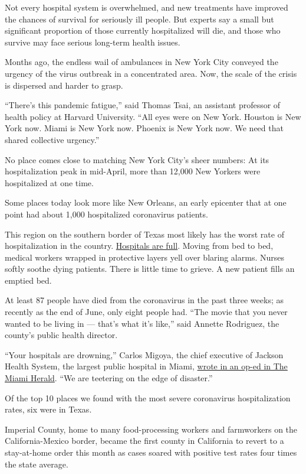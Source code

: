 Not every hospital system is overwhelmed, and new treatments have
improved the chances of survival for seriously ill people. But experts
say a small but significant proportion of those currently hospitalized
will die, and those who survive may face serious long-term health
issues.

Months ago, the endless wail of ambulances in New York City conveyed the
urgency of the virus outbreak in a concentrated area. Now, the scale of
the crisis is dispersed and harder to grasp.

``There's this pandemic fatigue,'' said Thomas Tsai, an assistant
professor of health policy at Harvard University. ``All eyes were on New
York. Houston is New York now. Miami is New York now. Phoenix is New
York now. We need that shared collective urgency.''

No place comes close to matching New York City's sheer numbers: At its
hospitalization peak in mid-April, more than 12,000 New Yorkers were
hospitalized at one time.

Some places today look more like New Orleans, an early epicenter that at
one point had about 1,000 hospitalized coronavirus patients.

This region on the southern border of Texas most likely has the worst
rate of hospitalization in the country.
\href{https://www.nytimes3xbfgragh.onion/2020/07/19/us/coronavirus-texas-rio-grande-valley.html}{Hospitals
are full}. Moving from bed to bed, medical workers wrapped in protective
layers yell over blaring alarms. Nurses softly soothe dying patients.
There is little time to grieve. A new patient fills an emptied bed.

At least 87 people have died from the coronavirus in the past three
weeks; as recently as the end of June, only eight people had. ``The
movie that you never wanted to be living in --- that's what it's like,''
said Annette Rodriguez, the county's public health director.

``Your hospitals are drowning,'' Carlos Migoya, the chief executive of
Jackson Health System, the largest public hospital in Miami,
\href{https://www.miamiherald.com/opinion/op-ed/article244194817.html}{wrote
in an op-ed in The Miami Herald}. ``We are teetering on the edge of
disaster.''

Of the top 10 places we found with the most severe coronavirus
hospitalization rates, six were in Texas.

Imperial County, home to many food-processing workers and farmworkers on
the California-Mexico border, became the first county in California to
revert to a stay-at-home order this month as cases soared with positive
test rates four times the state average.

